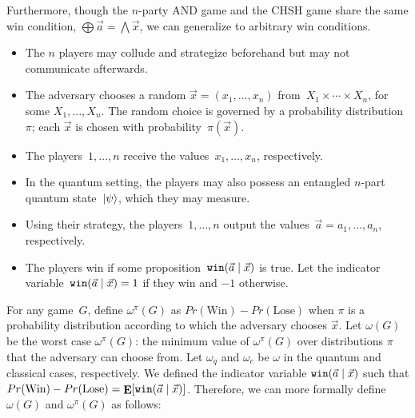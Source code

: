 




Furthermore, though the $n$-party AND game and the CHSH game share the same win condition, $\bigoplus \vec{a} = \bigwedge \vec{x}$, we can generalize to arbitrary win conditions.

\begin{itemize}
\item{The $n$ players may collude and strategize beforehand but may not communicate afterwards.}
\item{The adversary chooses a random $\vec{x}=(x_1, \ldots, x_n)$ from~$X_1 \times \cdots \times X_n$, for some $X_1, \ldots, X_n$. The random choice is governed by a probability distribution~$\pi$; each $\vec{x}$ is chosen with probability~$\pi(\vec{x})$.}
\item{The players~$1, \ldots, n$ receive the values~$x_1, \ldots, x_n$, respectively.}
\item{In the quantum setting, the players may also possess an entangled $n$-part quantum state~$\ket{\psi}$, which they may measure.}
\item{Using their strategy, the players~$1, \ldots, n$ output the values~$\vec{a} = a_1, \ldots, a_n$, respectively.}
\item{The players win if some proposition~$\texttt{win}(\vec{a} \nobreak\mid\nobreak \vec{x})$ is true. Let the indicator variable~$\texttt{win}(\vec{a} \nobreak\mid\nobreak \vec{x}) = 1$ if they win and $-1$ otherwise.}
\end{itemize}

For any game~$G$, define $\omega^\pi(G)$ as $Pr(\textrm{Win}) - Pr(\textrm{Lose})$ when $\pi$ is a probability distribution according to which the adversary chooses $\vec{x}$. Let $\omega(G)$ be the worst case $\omega^\pi(G)$: the minimum value of $\omega^\pi(G)$ over distributions $\pi$ that the adversary can choose from. Let $\omega_q$ and $\omega_c$ be $\omega$ in the quantum and classical cases, respectively. We defined the indicator variable $\texttt{win}(\vec{a}\nobreak\mid\nobreak\vec{x})$ such that $Pr(\textrm{Win}) - Pr(\textrm{Lose}) = \mathop{\mathbf{E}}[ \texttt{win}(\vec{a}\nobreak\mid\nobreak\vec{x}) ]$. Therefore, we can more formally define $\omega(G)$ and $\omega^\pi(G)$ as follows:

